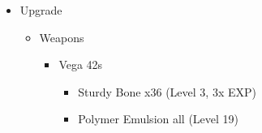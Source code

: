 \begin{upgrade}
  \begin{itemize}
    \item Upgrade
          \begin{itemize}
            \item Weapons
                  \begin{itemize}
                    \item Vega 42s
                          \begin{itemize}
                            \item Sturdy Bone x36 (Level 3, 3x EXP)
                            \item Polymer Emulsion all (Level 19)
                          \end{itemize}
                  \end{itemize}
          \end{itemize}
  \end{itemize}
\end{upgrade}

